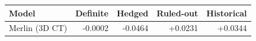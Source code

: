 \begin{tabular}{lrrrr}
\toprule
Model & Definite & Hedged & Ruled-out & Historical \\
\midrule
Merlin (3D CT) & -0.0002 & -0.0464 & +0.0231 & +0.0344 \\
\bottomrule
\end{tabular}
